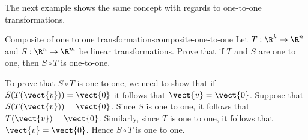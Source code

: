 The next example shows the same concept with regards to one-to-one transformations. 

\begin{example}{Composite of one to one transformations}{composite-one-to-one}
Let $T: \R^k \to \R^n$ and $S: \R^n \to \R^m$ be linear transformations. 
Prove that if $T$ and $S$ are one to one, then $S \circ T$ 
is one-to-one.
\end{example}

\begin{solution}
To prove that $S \circ T$ is one to one, we need to show that if $S(T (\vect{v})) = \vect{0}$ it follows that $\vect{v} = \vect{0}$. 
Suppose that  $S(T (\vect{v})) = \vect{0}$. Since $S$ is one to one, it follows that  $T (\vect{v}) = \vect{0}$. Similarly, since $T$ is one to one, it follows that $\vect{v} = \vect{0}$. Hence $S \circ T$ is one to one. 
\end{solution}
